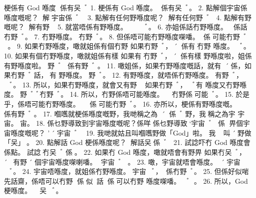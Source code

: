 梗係有 God 喺度
係有㕦ﾞ
1. 梗係有 God 喺度。 係有㕦ﾞ。
2. 點解個宇宙係喺度嘅呢？ 解宇宙係ﾞ？
3. 點解有任何野喺度呢？ 解有任何野ﾞ？
4. 點解有野嘅呢？ 解有野？
5. 就當唔係有野喺度。 𠄡係有野ﾞ。
6. 亦姐係話冇野喺度。 係話冇野ﾞ。
7. 冇野喺度。 冇野ﾞ。
8. 但係唔可能冇野喺度㗎噃。 係𠄡可能冇野ﾞ。
9. 如果冇野喺度，噉就姐係有個冇野
如果冇野ﾞ，´係有冇野
喺度。
ﾞ。
10. 如果有個冇野喺度，噉就姐係有樣
如果有冇野ﾞ，´係有樣
野喺度啦，姐係有野喺度啦。
野ﾞ，係有野ﾞ。
11. 噉姐係，如果冇野喺度嘅話，就有
´係，如果冇野ﾞ話，有
野喺度。
野ﾞ。
12. 有野喺度，就唔係冇野喺度。 有野ﾞ，𠄡係冇野ﾞ。
13. 所以，如果冇野喺度，就會又有野
，如果冇野ﾞ，ﾞ有
喺度又冇野喺度。
野ﾞﾞ冇野ﾞ。
14. 所以，冇野係唔可能喺度。 ，冇野係𠄡可能ﾞ。
15. 於是乎，係唔可能冇野喺度。 ，係𠄡可能冇野ﾞ。
16. 亦所以，梗係有野喺度嘅。 ，係有野ﾞ。
17. 嗰嚿就梗係喺度嘅野，我哋稱之為
´係ﾞ野，我稱之為宇
宇宙。
宙。
18. 係乜野導致到宇宙喺度嘅呢？係咩
係乜野導致`宇宙ﾞ？係
畀個宇宙喺度嘅呢？
'´宇宙ﾞ？
19. 我哋就姑且叫嗰嚿野做「God」啦。 我叫´野做「㕦」。
20. 點解話 God 梗係喺度呢？ 解話㕦係ﾞ？
21. 試諗吓冇 God 喺度會係點。 試諗冇㕦ﾞ係。
22. 如果冇 God 喺度，噉就唔會有野畀
如果冇㕦ﾞ，´𠄡有野´
個宇宙喺度㗎喇噃。
宇宙ﾞ。
23. 噉，宇宙就唔會喺度。 ´，宇宙𠄡ﾞ。
24. 宇宙唔喺度，就姐係冇野喺度。 宇宙𠄡ﾞ，係冇野ﾞ。
25. 但係好似啱先話齋，係唔可以冇野
係似話，係𠄡可以冇野
喺度㗎噃。
ﾞ。
26. 所以，God 梗喺度。 ，㕦ﾞ。